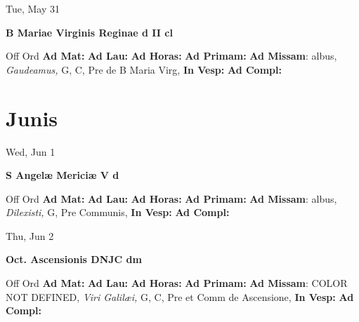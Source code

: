 \documentclass[10pt]{book}
\begin{document}
\begin{center}
\begin{minipage}{3.5in}
\vspace{2em}
\begin{center}Tue, May 31
\end{center}
\textbf{ \large B Mariae Virginis Reginae
\textnormal{\normalsize d II cl}}

\begin{justify}Off Ord
\textbf{Ad Mat: }
\textbf{Ad Lau: }
\textbf{Ad Horas: }
\textbf{Ad Primam: }\textbf{Ad Missam}: albus, \textit{Gaudeamus,} G, C, Pre de B Maria Virg, 
\textbf{In Vesp: }
\textbf{Ad Compl: }
\end{justify}
\end{minipage}
\end{center}

    \chapter*{Junis}
                    
\begin{center}
\begin{minipage}{3.5in}
\vspace{2em}
\begin{center}Wed, Jun 1
\end{center}
\textbf{ \large S Angelæ Mericiæ V
\textnormal{\normalsize d}}

\begin{justify}Off Ord
\textbf{Ad Mat: }
\textbf{Ad Lau: }
\textbf{Ad Horas: }
\textbf{Ad Primam: }\textbf{Ad Missam}: albus, \textit{Dilexisti,} G, Pre Communis, 
\textbf{In Vesp: }
\textbf{Ad Compl: }
\end{justify}
\end{minipage}
\end{center}

\begin{center}
\begin{minipage}{3.5in}
\vspace{2em}
\begin{center}Thu, Jun 2
\end{center}
\textbf{ \large Oct. Ascensionis DNJC
\textnormal{\normalsize dm}}

\begin{justify}Off Ord
\textbf{Ad Mat: }
\textbf{Ad Lau: }
\textbf{Ad Horas: }
\textbf{Ad Primam: }\textbf{Ad Missam}: COLOR NOT DEFINED, \textit{Viri Galilæi,} G, C, Pre et Comm de Ascensione, 
\textbf{In Vesp: }
\textbf{Ad Compl: }
\end{justify}
\end{minipage}
\end{center}
\end{document}
